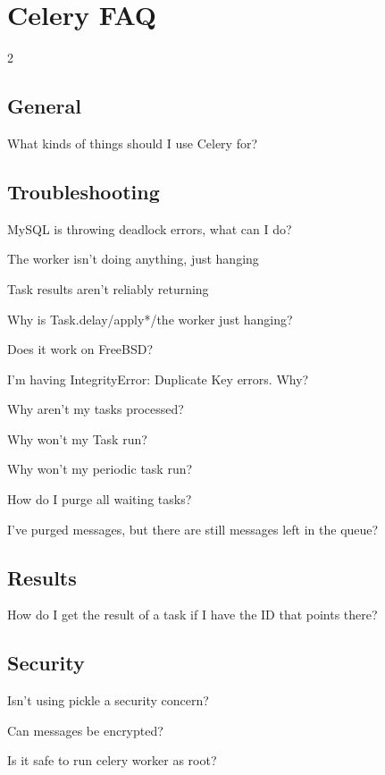 \documentclass [8pt] {extarticle}
\begin{document}
\section {Celery FAQ}
    \begin {multicols} {2}

    \subsection {General}

        What kinds of things should I use Celery for?

    \subsection {Troubleshooting}

        MySQL is throwing deadlock errors, what can I do?

        The worker isn’t doing anything, just hanging

        Task results aren’t reliably returning

        Why is Task.delay/apply*/the worker just hanging?

        Does it work on FreeBSD?

        I’m having IntegrityError: Duplicate Key errors. Why?

        Why aren’t my tasks processed?

        Why won’t my Task run?

        Why won’t my periodic task run?

        How do I purge all waiting tasks?

        I’ve purged messages, but there are still messages left in the queue?

    \subsection {Results}

        How do I get the result of a task if I have the ID that points there?

    \subsection {Security}

        Isn’t using pickle a security concern?

        Can messages be encrypted?

        Is it safe to run celery worker as root?


\end{multicols}
\end{document}
